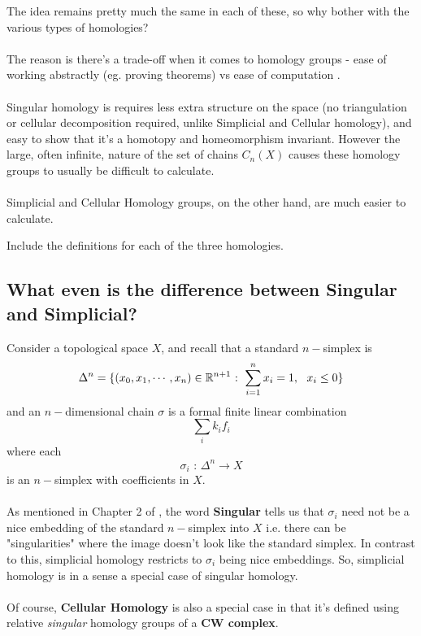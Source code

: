 \documentclass[11pt]{article}
\begin{document}
The idea remains pretty much the same in each of these, so why bother with the various types of homologies?
\\
\\
The reason is there's a trade-off when it comes to homology groups - ease of working abstractly (eg. proving theorems) vs ease of computation \cite{TizkovaMSEPost}.
\\
\\
Singular homology is requires less extra structure on the space (no triangulation or cellular decomposition required, unlike Simplicial and Cellular homology), and easy to show that it's a homotopy and homeomorphism invariant. However the large, often infinite, nature of the set of chains $C_n(X)$ causes these homology groups to usually be difficult to calculate.
\\
\\
Simplicial and Cellular Homology groups, on the other hand, are much easier to calculate. \begin{note}
  {Include the definitions for each of the three homologies.}
\end{note}

\subsection{What even is the difference between Singular and Simplicial?}

Consider a topological space $X$, and recall that a standard $n-$simplex is 
$$\Delta^n = \{(x_0, x_1, \cdots, x_n) \in \mathbb{R}^{n+1} \text{ : } \sum_{i = 1}^{n} x_i = 1,~~x_i \leq 0\}$$
and an $n-$dimensional chain $\sigma$ is a formal finite linear combination $$\sum_{i} k_i f_i $$ where each $$ \sigma_i \text{ : } \Delta^n \rightarrow X $$ is an $n-$simplex with coefficients in $X$.
\\
\\
As mentioned in Chapter 2 of \cite{HatcherAlgTop}, the word \textbf{Singular} tells us that $\sigma_i$ need not be a nice embedding of the standard $n-$simplex into $X$ i.e. there can be "singularities" where the image doesn't look like the standard simplex. In contrast to this, simplicial homology restricts to $\sigma_i$ being nice embeddings. So, simplicial homology is in a sense a special case of singular homology.
\\
\\
Of course, \textbf{Cellular Homology} is also a special case in that it's defined using relative \emph{singular} homology groups of a \textbf{CW complex}. 
\end{document}
